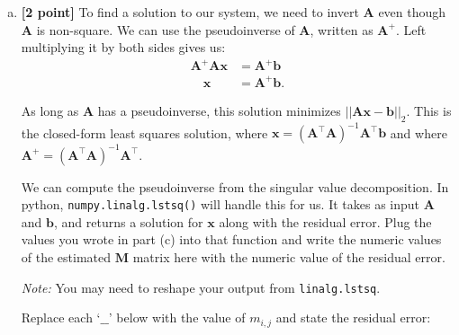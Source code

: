 \begin{enumerate}[(a)]
\pagebreak
\item \textbf{[2 point]} To find a solution to our system, we need to invert $\bm{A}$ even though $\bm{A}$ is non-square. We can use the pseudoinverse of $\bm{A}$, written as $\bm{A}^+$. Left multiplying it by both sides gives us:
\begin{align*}
 \bm{A}^+ \bm{A}\bm{x} &= \bm{A}^+ \bm{b}\\
 \quad \bm{x} &= \bm{A}^+ \bm{b}.
\end{align*}

As long as $\bm{A}$ has a pseudoinverse, this solution minimizes $||\bm{A}\bm{x} - \bm{b}||_2$. This is the closed-form least squares solution, where $\bm{x} = (\bm{A}^\top \bm{A})^{-1}\bm{A}^\top\bm{b}$ and where $\bm{A}^+ = (\bm{A}^\top \bm{A})^{-1}\bm{A}^\top$.

We can compute the pseudoinverse from the singular value decomposition. In python, \texttt{numpy.linalg.lstsq()} will handle this for us. It takes as input $\bm{A}$ and $\bm{b}$, and returns a solution for $\bm{x}$ along with the residual error. Plug the values you wrote in part (c) into that function and write the numeric values of the estimated $\bm{M}$ matrix here with the numeric value of the residual error.

\textit{Note:} You may need to reshape your output from \texttt{linalg.lstsq}.

\begin{tcolorbox}[colback=orange!5!white,colframe=orange!75!black]
Replace each `$\_\_$' below with the value of $m_{i, j}$ and state the residual error:
\end{tcolorbox}



\end{enumerate}
